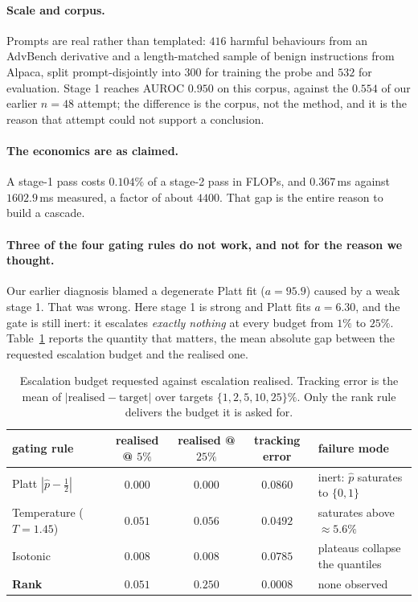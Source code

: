 \documentclass[10pt]{article}
\theoremstyle{plain}
\theoremstyle{definition}
\theoremstyle{remark}
\begin{document}
\paragraph{Scale and corpus.} Prompts are real rather than templated: $416$ harmful
behaviours from an AdvBench derivative and a length-matched sample of benign instructions
from Alpaca, split prompt-disjointly into $300$ for training the probe and $532$ for
evaluation. Stage 1 reaches AUROC $0.950$ on this corpus, against the $0.554$ of our
earlier $n{=}48$ attempt; the difference is the corpus, not the method, and it is the
reason that attempt could not support a conclusion.

\paragraph{The economics are as claimed.} A stage-1 pass costs $0.104\%$ of a stage-2 pass
in FLOPs, and $0.367$\,ms against $1602.9$\,ms measured, a factor of about $4400$. That
gap is the entire reason to build a cascade.

\paragraph{Three of the four gating rules do not work, and not for the reason we thought.}
Our earlier diagnosis blamed a degenerate Platt fit ($a{=}95.9$) caused by a weak stage 1.
That was wrong. Here stage 1 is strong and Platt fits $a{=}6.30$, and the gate is still
inert: it escalates \emph{exactly nothing} at every budget from $1\%$ to $25\%$.
Table~\ref{tab:gates} reports the quantity that matters, the mean absolute gap between the
requested escalation budget and the realised one.

\begin{table}[!ht]
\centering\small
\begin{tabular}{lcccl}
\toprule
gating rule & realised @ $5\%$ & realised @ $25\%$ & tracking error & failure mode\\
\midrule
Platt $|\hat p-\frac12|$        & $0.000$ & $0.000$ & $0.0860$
  & inert: $\hat p$ saturates to $\{0,1\}$\\
Temperature ($T{=}1.45$)        & $0.051$ & $0.056$ & $0.0492$
  & saturates above $\approx5.6\%$\\
Isotonic                        & $0.008$ & $0.008$ & $0.0785$
  & plateaus collapse the quantiles\\
\textbf{Rank}                   & $\mathbf{0.051}$ & $\mathbf{0.250}$ & $\mathbf{0.0008}$
  & none observed\\
\bottomrule
\end{tabular}
\caption{Escalation budget requested against escalation realised. Tracking error is the
mean of $|\text{realised}-\text{target}|$ over targets $\{1,2,5,10,25\}\%$. Only the
rank rule delivers the budget it is asked for.}
\label{tab:gates}
\end{table}
\end{document}
